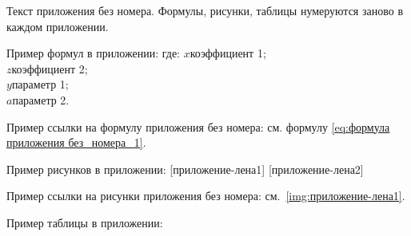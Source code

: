 \setcounter{equation}{0} %
\setcounter{table}{0} %
\setcounter{illustration}{0} %

Текст приложения без номера. Формулы, рисунки, таблицы нумеруются заново в каждом приложении.

Пример формул в приложении:
%
\noindent где: $x$\ndash коэффициент 1; \\
\indent $z$\ndash коэффициент 2;\\
\indent $y$\ndash параметр 1;\\
\indent $a$\ndash параметр 2.

Пример ссылки на формулу приложения без номера: см. формулу \ref{eq:формула приложения без_номера_1}.

Пример рисунков в приложении:
[приложение-лена1]
[приложение-лена2]

Пример ссылки на рисунки приложения без номера: см.~\ref{img:приложение-лена1}.

\newpage
Пример таблицы в приложении:

